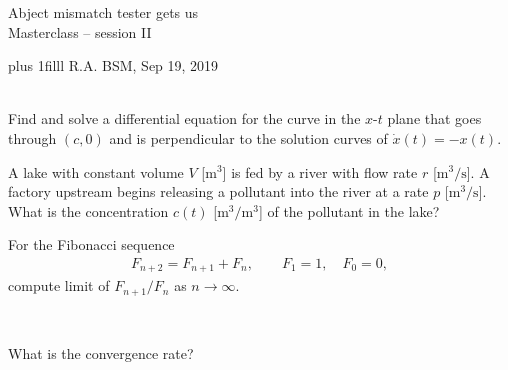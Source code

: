 \documentclass[onepage, 12pt]{beamer}
\author{RA}
\def\Bottom#1{\vskip 0pt plus 1filll #1}
\begin{document}


\begin{frame}[plain,t]
	\begin{center}
        \vspace{1cm}
		Abject mismatch tester gets us
		\\
		{\small\color{gray} Masterclass -- session II}

		\vspace{1cm}

	\end{center}
	
	
	\Bottom{
		\scriptsize
		R.A.
		\hfill
		BSM, Sep 19, 2019
		\\ {\ }
	}
\end{frame}




\begin{frame}{}{}
    Find and solve a differential equation
    for the curve in the $x$-$t$ plane
    that goes
    through $(c, 0)$
    and is perpendicular
    to the solution curves of $\dot{x}(t) = -x(t)$.
\end{frame}



\begin{frame}{}{}
    A lake with constant volume $V$ [$\mathrm{m^3}$]
    is fed by a river with flow rate $r$ [$\mathrm{m^3/s}$].
    A factory upstream begins releasing a pollutant
    into the river at a rate $p$ [$\mathrm{m^3/s}$].
    What is the concentration $c(t)$ [$\mathrm{m^3/m^3}$] of the pollutant in the lake?
\end{frame}


\begin{frame}{}{}
    For the Fibonacci sequence 
    \begin{align*}
        F_{n + 2} = F_{n + 1} + F_n,
        \qquad
        F_1 = 1,
        \quad
        F_0 = 0,
    \end{align*}
    compute limit of $F_{n+1} / F_n$ as $n \to \infty$.
    
    {\ }
    
    \pause
    
    What is the convergence rate?
\end{frame}
\end{document}
